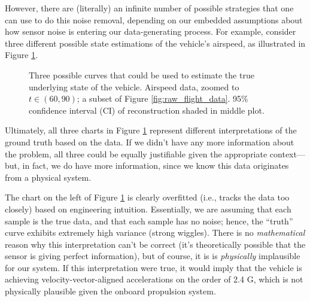 \documentclass[conf]{new-aiaa}
\begin{document}
    However, there are (literally) an infinite number of possible strategies that one can use to do this noise removal, depending on our embedded assumptions about how sensor noise is entering our data-generating process. For example, consider three different possible state estimations of the vehicle's airspeed, as illustrated in Figure \ref{fig:under_over_fitting}.

    \begin{figure}[H]
        \centering
        \caption{Three possible curves that could be used to estimate the true underlying state of the vehicle. Airspeed data, zoomed to $t \in (60, 90)$; a subset of Figure \ref{fig:raw_flight_data}. 95\% confidence interval (CI) of reconstruction shaded in middle plot.}
        \label{fig:under_over_fitting}
    \end{figure}

    Ultimately, all three charts in Figure \ref{fig:under_over_fitting} represent different interpretations of the ground truth based on the data. If we didn't have any more information about the problem, all three could be equally justifiable given the appropriate context—but, in fact, we do have more information, since we know this data originates from a physical system.

    The chart on the left of Figure \ref{fig:under_over_fitting} is clearly overfitted (i.e., tracks the data too closely) based on engineering intuition. Essentially, we are assuming that each sample is the true data, and that each sample has no noise; hence, the ``truth'' curve exhibits extremely high variance (strong wiggles). There is no \emph{mathematical} reason why this interpretation can't be correct (it's theoretically possible that the sensor is giving perfect information), but of course, it is is \emph{physically} implausible for our system. If this interpretation were true, it would imply that the vehicle is achieving velocity-vector-aligned accelerations on the order of 2.4 G, which is not physically plausible given the onboard propulsion system.
\end{document}

